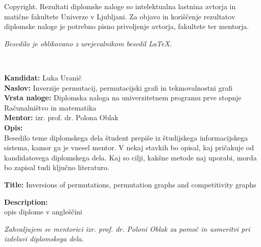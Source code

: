 \documentclass[a4paper, 12pt]{book}
\newcommand{\ttitle}{Inverzije permutacij, permutacijski grafi in tekmovalnostni grafi}
\newcommand{\ttitleEn}{Inversions of permutations, permutation graphs and competitivity graphs}
\newcommand{\clearemptydoublepage}{\newpage{\pagestyle{empty}\cleardoublepage}}
\begin{document}
\thispagestyle{empty}
\vspace*{8cm}

\noindent
{\sc Copyright}. 
Rezultati diplomske naloge so intelektualna lastnina avtorja in matične fakultete Univerze v Ljubljani.
Za objavo in koriščenje rezultatov diplomske naloge je potrebno pisno privoljenje avtorja, fakultete ter mentorja.

\begin{center}
\mbox{}\vfill
\emph{Besedilo je oblikovano z urejevalnikom besedil \LaTeX.}
\end{center}
\clearemptydoublepage

\thispagestyle{empty}
\
\vfill

\bigskip
\noindent\textbf{Kandidat:} Luka Uranič\\
\noindent\textbf{Naslov:} \ttitle\\
\noindent\textbf{Vrsta naloge:} Diplomska naloga na univerzitetnem programu prve stopnje Računalništvo in matematika \\
\noindent\textbf{Mentor:}  izr. prof. dr. Polona Oblak\\

\bigskip
\noindent\textbf{Opis:}\\
Besedilo teme diplomskega dela študent prepiše iz študijskega informacijskega sistema, kamor ga je vnesel mentor. 
V nekaj stavkih bo opisal, kaj pričakuje od kandidatovega diplomskega dela. 
Kaj so cilji, kakšne metode naj uporabi, morda bo zapisal tudi ključno literaturo.

\bigskip
\noindent\textbf{Title:} \ttitleEn

\bigskip
\noindent\textbf{Description:}\\
opis diplome v angleščini

\vfill



\vspace{2cm}

\clearemptydoublepage

\thispagestyle{empty}\mbox{}\vfill\null\it%
\noindent
Zahvaljujem se mentorici izr. prof. dr. Poloni Oblak za pomoč in usmeritvi pri izdelavi diplomskega dela.\\
\rm\normalfont
\end{document}
